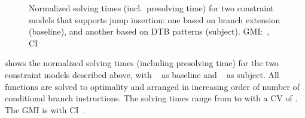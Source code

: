 

\begin{figure}
  \centering%
  \maxsizebox{\textwidth}{!}{%
    \trimBarchartPlot{%
    }%
  }

  \caption[%
            Plot comparing solving times for two constraint models supporting
            jump instruction insertion%
          ]%
          {%
            Normalized solving times (incl.\ presolving time) for two
            constraint models that supports jump insertion: one based on branch
            extension (baseline), and another based on DTB patterns (subject).
            GMI:~\printGMI{%
              \DualTargetPatternsVsBranchExtPrePlusSolvingTimeSpeedupPrePlusSolvingTimeRegularSpeedupGmean%
            },
            CI~\printGMICI{%
              \DualTargetPatternsVsBranchExtPrePlusSolvingTimeSpeedupPrePlusSolvingTimeRegularSpeedupCiMin%
            }{%
              \DualTargetPatternsVsBranchExtPrePlusSolvingTimeSpeedupPrePlusSolvingTimeRegularSpeedupCiMax%
            }%
          }
\end{figure}

shows the normalized solving times (including \gls{presolving} time) for the two
\glspl{constraint model} described above, with ~ as \gls{baseline} and ~ as \gls{subject}.
%
All \glspl{function} are solved to optimality and arranged in increasing order
of number of conditional branch \glspl{instruction}.
%
The solving times range from
\printMinSolvingTime{%
  \DualTargetPatternsVsBranchExtPrePlusSolvingTimeSpeedupSolvingTimeAvgMin,
  \DualTargetPatternsVsBranchExtPrePlusSolvingTimeSpeedupBaselineSolvingTimeAvgMin
}
to
\printMaxSolvingTime{%
  \DualTargetPatternsVsBranchExtPrePlusSolvingTimeSpeedupSolvingTimeAvgMax,
  \DualTargetPatternsVsBranchExtPrePlusSolvingTimeSpeedupBaselineSolvingTimeAvgMax
}
with a \gls{CV} of
\numMaxOf{%
  \DualTargetPatternsVsBranchExtPrePlusSolvingTimeSpeedupSolvingTimeCvMax,
  \DualTargetPatternsVsBranchExtPrePlusSolvingTimeSpeedupBaselineSolvingTimeCvMax
}.
The \gls{GMI} is \printGMI{%
  \DualTargetPatternsVsBranchExtPrePlusSolvingTimeSpeedupPrePlusSolvingTimeRegularSpeedupGmean%
} with \gls{CI}~\printGMICI{%
  \DualTargetPatternsVsBranchExtPrePlusSolvingTimeSpeedupPrePlusSolvingTimeRegularSpeedupCiMin%
}{%
  \DualTargetPatternsVsBranchExtPrePlusSolvingTimeSpeedupPrePlusSolvingTimeRegularSpeedupCiMax%
}.

